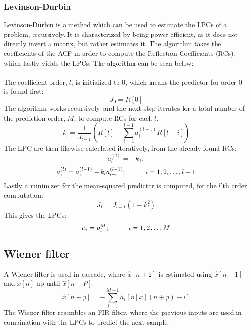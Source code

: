 \subsubsection{Levinson-Durbin}
Levinson-Durbin is a method which can be used to estimate the LPCs of a problem, recursively. It is characterized by being power efficient, as it does not directly invert a matrix, but rather estimates it. 
The algorithm takes the coefficients of the ACF in order to compute the Reflection Coefficients (RCs), which lastly yields the LPCs. The algorithm can be seen below:\\\\
The coefficient order, $l$, is initialized to 0, which means the predictor for order 0 is found first:
\begin{equation}\label{LDInit}
	J_0=R[0]
\end{equation}
The algorithm works recursively, and the next step iterates for a total number of the prediction order, $M$, to compute RCs for each $l$.
\begin{equation}\label{LDStep1}
	k_l=\frac{1}{J_{l-1}} \left ( R[l] + \sum_{i=1}^{l-1} a_i^{(l-1)}R[l-i]   \right) 
\end{equation}
The LPC are then likewise calculated iteratively, from the already found RCs: 
\begin{equation}\label{LDStep2_1}
	a_l^{(l)} = -k_1,
\end{equation}
\begin{equation}\label{LDStep2_2}
a_i^{(l)} = a_i^{(l-1)} - k_l a_{l-i}^{(l-1)} ; \hspace{10mm} i = 1,2,\dotsc,l-1
\end{equation}
Lastly a minimizer for the mean-squared predictor is computed, for the $l$'th order computation:
\begin{equation}\label{LDStep2}
	J_1 = J_{l-1} (1-k_l^2)
\end{equation}
This gives the LPCs:
\begin{equation}
	a_i = a_i^{M}; \hspace{10mm} i = 1,2 \dotsc , M
\end{equation}


\subsection{Wiener filter}
A Wiener filter is used in cascade, where $\hat{x}[n+2]$ is estimated using $\hat{x}[n+1]$ and $x[n]$ up until $\hat{x}[n+P]$. 
\begin{equation}\label{eq:AppPredictor}
\hat{x}[n+p] =- \sum^{M-1}_{i=1}\hat{a}_i[n]x[(n+p)-i]
\end{equation}
The Wiener filter resembles an FIR filter, where the previous inputs are used in combination with the LPCs to predict the next sample. 

